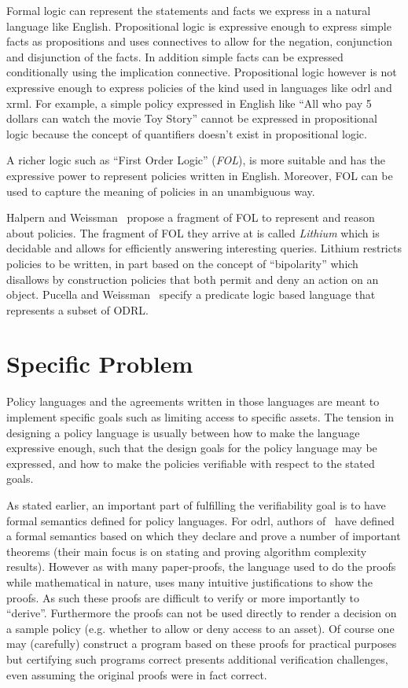 \documentclass[runningheads,a4paper]{llncs}
\begin{document}
Formal logic can represent the statements and facts we express in a natural language like English. Propositional logic is expressive enough to express simple facts as propositions and uses connectives to allow for the negation, conjunction and disjunction of the facts. In addition simple facts can be expressed conditionally using the implication connective. Propositional logic however is not expressive enough to express policies of the kind used in languages like \ac{odrl} and \ac{xrml}. For example, a simple policy expressed in English like ``All who pay 5 dollars can watch the movie Toy Story'' cannot be expressed in propositional logic because the concept of quantifiers doesn't exist in propositional logic. 

A richer logic such as ``First Order Logic'' (\emph{FOL}), is more suitable and has the expressive power to represent policies written in English. Moreover, FOL can be used to capture the meaning of policies in an unambiguous way.

Halpern and Weissman~\cite{Halpern2008} propose a fragment of FOL to represent and reason about policies. The fragment of FOL they arrive at is called \emph{Lithium} which is decidable and allows for efficiently answering interesting queries. Lithium restricts policies to be written, in part based on the concept of ``bipolarity'' which disallows by construction policies that both permit and deny an action on an object. Pucella and Weissman~\cite{pucella2006} specify a predicate logic based language that represents a subset of ODRL.


\section{Specific Problem}

Policy languages and the agreements written in those languages are meant to implement specific goals such as limiting access to specific assets. The tension in designing a policy language is usually between how to make the language expressive enough, such that the design goals for the policy language may be expressed, and how to make the policies verifiable with respect to the stated goals.

As stated earlier, an important part of fulfilling the verifiability goal is to have formal semantics defined for policy languages. For \ac{odrl}, authors of~\cite{pucella2006} have defined a formal semantics based on which they declare and prove a number of important theorems (their main focus is on stating and proving algorithm complexity results). However as with many paper-proofs, the language used to do the proofs while mathematical in nature, uses many intuitive justifications to show the proofs. As such these proofs are difficult to verify or more importantly to ``derive''. Furthermore the proofs can not be used directly to render a decision on a sample policy (e.g. whether to allow or deny access to an asset). Of course one may (carefully) construct a program based on these proofs for practical purposes but certifying such programs correct presents additional verification challenges, even assuming the original proofs were in fact correct.
\end{document}
